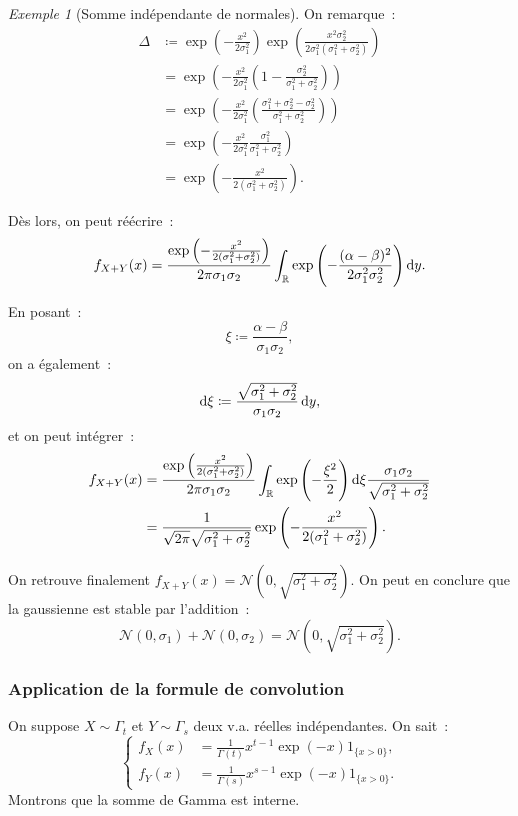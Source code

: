 \documentclass{article}
\newcommand{\R}{\mathbb R}
\theoremstyle{definition}
\theoremstyle{remark}
\newtheorem{ex}{Exemple}
\begin{document}
\begin{ex}[Somme indépendante de normales]
		On remarque~:
		\begin{align*}
			\Delta &\coloneqq \exp\left(-\frac {x^2}{2\sigma_1^2}\right)\exp\left(\frac {x^2\sigma_2^2}{2\sigma_1^2(\sigma_1^2 + \sigma_2^2)}\right) \\
			       &= \exp\left(-\frac {x^2}{2\sigma_1^2}\left(1 - \frac {\sigma_2^2}{\sigma_1^2 + \sigma_2^2}\right)\right) \\
			       &= \exp\left(-\frac {x^2}{2\sigma_1^2}\left(\frac {\sigma_1^2 + \sigma_2^2 - \sigma_2^2}{\sigma_1^2 + \sigma_2^2}\right)\right) \\
			       &= \exp\left(-\frac {x^2}{2\sigma_1^2}\frac {\sigma_1^2}{\sigma_1^2 + \sigma_2^2}\right) \\
			       &= \exp\left(-\frac {x^2}{2(\sigma_1^2 + \sigma_2^2)}\right).
		\end{align*}

		Dès lors, on peut réécrire~:
		\[f_{X+Y}(x) = \frac {\exp\left(-\frac {x^2}{2(\sigma_1^2 + \sigma_2^2)}\right)}{2\pi\sigma_1\sigma_2}\int_\R\exp\left(-\frac {(\alpha-\beta)^2}{2\sigma_1^2\sigma_2^2}\right)\dif y.\]

		En posant~:
		\[\xi \coloneqq \frac {\alpha-\beta}{\sigma_1\sigma_2},\]
		on a également~:
		\[\dif\xi \coloneqq \frac {\sqrt {\sigma_1^2 + \sigma_2^2}}{\sigma_1\sigma_2}\dif y,\]
		et on peut intégrer~:
		\begin{align*}
			f_{X+Y}(x) &= \frac {\exp\left(\frac {x^2}{2(\sigma_1^2 + \sigma_2^2)}\right)}{2\pi\sigma_1\sigma_2}\int_\R\exp\left(-\frac {\xi^2}2\right)\dif \xi\frac {\sigma_1\sigma_2}{\sqrt{\sigma_1^2 + \sigma_2^2}} \\
			           &= \frac 1{\sqrt {2\pi}\sqrt{\sigma_1^2+\sigma_2^2}}\exp\left(-\frac {x^2}{2(\sigma_1^2 + \sigma_2^2)}\right).
		\end{align*}

		On retrouve finalement $f_{X+Y}(x) = \mathcal N(0, \sqrt{\sigma_1^2+\sigma_2^2})$. On peut en conclure que la gaussienne est stable par l'addition~:
		\[\mathcal N(0, \sigma_1) + \mathcal N(0, \sigma_2) = \mathcal N(0, \sqrt{\sigma_1^2+\sigma_2^2}).\]
		\end{ex}

		\subsubsection{Application de la formule de convolution}
		On suppose $X \sim \Gamma_t$ et $Y \sim \Gamma_s$ deux v.a. réelles indépendantes. On sait~:
		\[\displaystyle \begin{cases}f_X(x) &= \frac 1{\Gamma(t)}x^{t-1}\exp(-x)1_{\{x > 0\}}, \\f_Y(x) &= \frac 1{\Gamma(s)}x^{s-1}\exp(-x)1_{\{x > 0\}}.\end{cases}\]
		Montrons que la somme de Gamma est interne.
\end{document}
